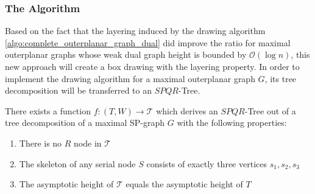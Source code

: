 \subsubsection{The Algorithm}

Based on the fact that the layering induced by the drawing algorithm \ref{algo:complete_outerplanar_graph_dual} did improve the ratio for maximal outerplanar graphs whose weak dual graph height is bounded by $\mathcal{O}(\log n)$, this new approach will create a box drawing with the layering property. In order to implement the drawing algorithm for a maximal outerplanar graph $G$, its tree decomposition will be transferred to an $SPQR$-Tree. 

\begin{lemma}
	There exists a function $f: (T,W) \to \mathcal{T}$ which derives an $SPQR$-Tree out of a tree decomposition of a maximal SP-graph $G$ with the following properties:
	\begin{enumerate}
		\item There is no $R$ node in $\mathcal{T}$
		\item The skeleton of any serial node $S$ consists of exactly three vertices $s_1,s_2,s_3$
		\item The asymptotic height of $\mathcal{T}$ equals the asymptotic height of $T$		
	\end{enumerate}\label{l:tree_decomp_to_SPQR}
\end{lemma}
